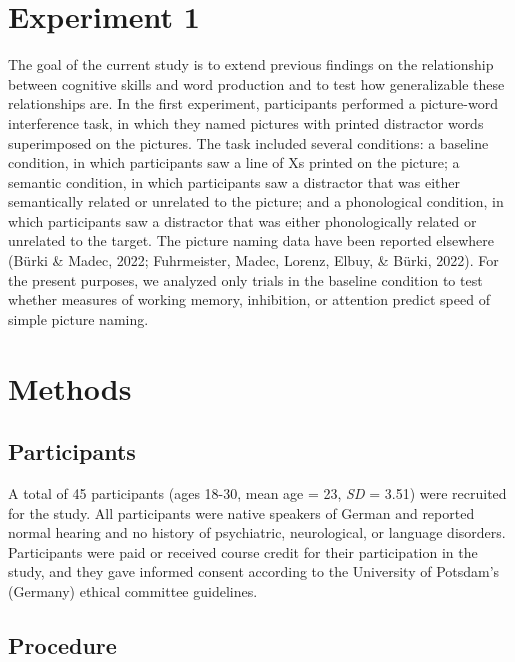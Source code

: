\documentclass[
  man,floatsintext]{apa6}
\begin{document}
\hypertarget{experiment-1}{%
\section{Experiment 1}\label{experiment-1}}

The goal of the current study is to extend previous findings on the relationship between cognitive skills and word production and to test how generalizable these relationships are. In the first experiment, participants performed a picture-word interference task, in which they named pictures with printed distractor words superimposed on the pictures. The task included several conditions: a baseline condition, in which participants saw a line of Xs printed on the picture; a semantic condition, in which participants saw a distractor that was either semantically related or unrelated to the picture; and a phonological condition, in which participants saw a distractor that was either phonologically related or unrelated to the target. The picture naming data have been reported elsewhere (Bürki \& Madec, 2022; Fuhrmeister, Madec, Lorenz, Elbuy, \& Bürki, 2022). For the present purposes, we analyzed only trials in the baseline condition to test whether measures of working memory, inhibition, or attention predict speed of simple picture naming.

\hypertarget{methods}{%
\section{Methods}\label{methods}}

\hypertarget{participants}{%
\subsection{Participants}\label{participants}}

A total of 45 participants (ages 18-30, mean age = 23, \emph{SD} = 3.51) were recruited for the study. All participants were native speakers of German and reported normal hearing and no history of psychiatric, neurological, or language disorders. Participants were paid or received course credit for their participation in the study, and they gave informed consent according to the University of Potsdam's (Germany) ethical committee guidelines.

\hypertarget{procedure}{%
\subsection{Procedure}\label{procedure}}
\end{document}
